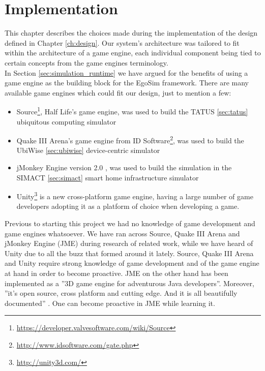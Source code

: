 \chapter{Implementation}\label{ch:implementation}
This chapter describes the choices made during the implementation of the design defined in Chapter \ref{ch:design}. Our system's architecture was tailored to fit within the architecture of a game engine, each individual component being tied to certain concepts from the game engines terminology.\\ 

In Section \ref{sec:simulation_runtime} we have argued for the benefits of using a game engine as the building block for the EgoSim framework. There are many available game engines which could fit our design, just to mention a few:
\begin{itemize}
	\item Source\footnote{\url{https://developer.valvesoftware.com/wiki/Source}}, Half Life's game engine, was used to build the TATUS \ref{sec:tatus} ubiquitous computing simulator
	\item Quake III Arena's game engine from ID Software\footnote{\url{http://www.idsoftware.com/gate.php}}, was used to build the UbiWise \ref{sec:ubiwise} device-centric simulator
	\item jMonkey Engine version 2.0 \cite{jme:online}, was used to build the simulation in the SIMACT \ref{sec:simact} smart home infrastructure simulator
	\item Unity\footnote{\url{http://unity3d.com/}} is a new cross-platform game engine, having a large number of game developers adopting it as a platform of choice when developing a game.
\end{itemize}

Previous to starting this project we had no knowledge of game development and game engines whatsoever. We have ran across Source, Quake III Arena and jMonkey Engine (JME) during research of related work, while we have heard of Unity due to all the buzz that formed around it lately. Source, Quake III Arena and Unity require strong knowledge of game development and of the game engine at hand in order to become proactive. JME on the other hand has been implemented as a ''3D game engine for adventurous Java developers''. Moreover, ''it's open source, cross platform and cutting edge. And it is all beautifully documented'' \cite{jme:online}. One can become proactive in JME while learning it.\\


